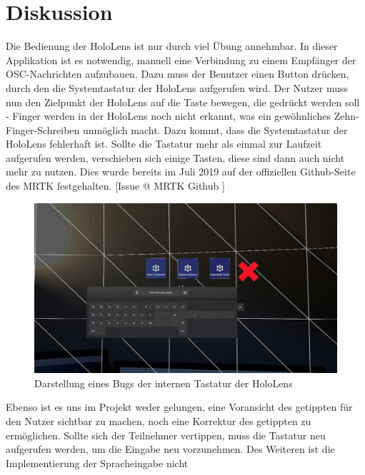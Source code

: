 \documentclass[11pt, titlepage, fleqn]{report}
\begin{document}
        \section{Diskussion}
        \label{sec:4.2}
        	Die Bedienung der HoloLens ist nur durch viel Übung 
        	annehmbar.
        	In dieser Applikation ist es notwendig, manuell eine Verbindung zu 
        	einem Empfänger der OSC-Nachrichten aufzubauen. Dazu muss der 
        	Benutzer einen Button drücken, durch den die Systemtastatur der 
        	HoloLens aufgerufen wird. 
        	Der Nutzer muss nun den Zielpunkt der HoloLens auf die Taste 
        	bewegen, die gedrückt werden soll - Finger werden in der HoloLens 
        	noch nicht erkannt, was ein gewöhnliches Zehn-Finger-Schreiben 
        	unmöglich macht.
        	Dazu kommt, dass die Systemtastatur der HoloLens fehlerhaft ist. 
        	Sollte die Tastatur mehr als einmal zur Laufzeit aufgerufen werden, 
        	verschieben sich einige Tasten, diese sind dann auch nicht mehr zu 
        	nutzen. Dies wurde bereits im Juli 2019 auf der offiziellen 
        	Github-Seite des MRTK festgehalten. [Issue @ MRTK Github 
        	\cite{MRTKGit}] 
        	\begin{figure}[H]
        		\centering
        		\includegraphics[width=0.8\linewidth]{./img/KeyBoardBug.jpg}
        		\caption{Darstellung eines Bugs der internen Tastatur der 
        			HoloLens \label{fig:Keyboard}}
        	\end{figure}
        	Ebenso ist es uns im Projekt weder gelungen, eine Voransicht des 
        	getippten für den Nutzer sichtbar zu machen, noch eine Korrektur 
        	des getippten zu ermöglichen. Sollte sich der Teilnehmer 
        	vertippen, muss die Tastatur neu aufgerufen werden, um die Eingabe 
        	neu vorzunehmen. \newline
        	Des Weiteren ist die Implementierung der Spracheingabe nicht 
\end{document}
